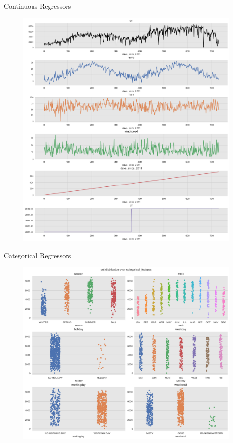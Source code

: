 \documentclass[10pt]{beamer}
\begin{document}
\begin{frame}{Continuous Regressors}
\begin{center}
  \begin{figure}
    \includegraphics[scale=0.25]{images/interpretable_ml_13_0.png} 
  \end{figure}
\end{center}
\end{frame}

\begin{frame}{Categorical Regressors}
\begin{center}
  \begin{figure}
    \includegraphics[scale=0.3]{images/interpretable_ml_21_0.png} 
  \end{figure}
\end{center}
\end{frame}
\end{document}

